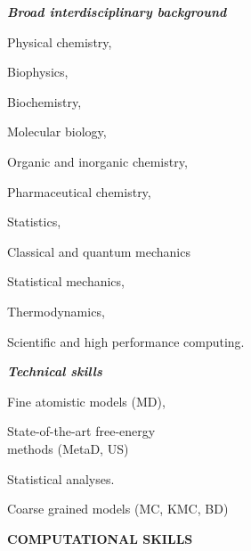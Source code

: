 \documentclass[a4paper,10pt,final]{memoir}
\newcommand{\Sep}{\vspace{1em}}
\newcommand{\SmallSep}{\vspace{0.4em}}
\newcommand{\CVSection}[1]
	{\Large\textbf{#1}\par
	\SmallSep\normalsize\normalfont}
\newcommand{\CVItem}[2]
	{\textit{\textbf{\color{RoyalBlue} #1}} #2}
\begin{document}
\CVItem{Broad interdisciplinary background} 
\begin{multicols}{3}
\begin{compactitem}[\color{RoyalBlue}$\circ$]
\item Physical chemistry,
\item Biophysics,
\item Biochemistry,
\item Molecular biology,
\item Organic and inorganic chemistry,
\item Pharmaceutical chemistry,
\item Statistics,
\item Classical and quantum mechanics
\item Statistical mechanics,
\item Thermodynamics,
\item Scientific and high performance computing. 
\end{compactitem}
\end{multicols}
\SmallSep
\CVItem{Technical skills}
\begin{multicols}{3}
\begin{compactitem}[\color{RoyalBlue}$\circ$]
\item Fine atomistic models (MD),
\item State-of-the-art free-energy\\ methods (MetaD, US)
\item Statistical analyses.
\item Coarse grained models (MC, KMC, BD)
\end{compactitem}
\end{multicols}
\Sep
\pagebreak
\CVSection{COMPUTATIONAL SKILLS}
\end{document}
